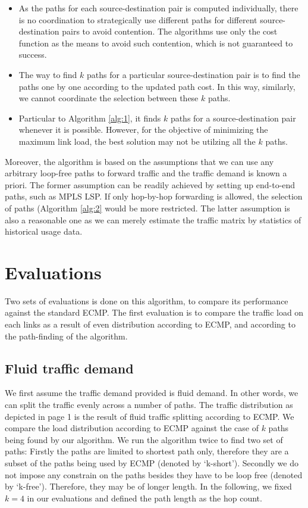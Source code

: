 \documentclass[conference]{IEEEtran}
\begin{document}
\begin{itemize}
\item As the paths for each source-destination pair is computed
	individually, there is no coordination to strategically use different
	paths for different source-destination pairs to avoid contention. The
	algorithms use only the cost function as the means to avoid such
	contention, which is not guaranteed to success.
\item The way to find $k$ paths for a particular source-destination pair is to
	find the paths one by one according to the updated path cost. In this
	way, similarly, we cannot coordinate the selection between these $k$
	paths.
\item Particular to Algorithm \ref{alg:1}, it finds $k$ paths for a
	source-destination pair whenever it is possible. However, for the
	objective of minimizing the maximum link load, the best solution may
	not be utilzing all the $k$ paths.
\end{itemize}

Moreover, the algorithm is based on the assumptions that we can use any
arbitrary loop-free paths to forward traffic and the traffic demand is known a
priori. The former assumption can be readily achieved by setting up end-to-end
paths, such as MPLS LSP. If only hop-by-hop forwarding is allowed, the
selection of paths (Algorithm \ref{alg:2} would be more restricted. The latter
assumption is also a reasonable one as we can merely estimate the traffic
matrix by statistics of historical usage data.

\section{Evaluations}\label{sec:eval}

Two sets of evaluations is done on this algorithm, to compare its performance
against the standard ECMP. The first evaluation is to compare the traffic load
on each links as a result of even distribution according to ECMP, and according
to the path-finding of the algorithm.

\subsection{Fluid traffic demand}

We first assume the traffic demand provided is fluid demand. In other words, we
can split the traffic evenly across a number of paths. The traffic distribution
as depicted in page 1 is the result of fluid traffic splitting according to
ECMP. We compare the load distribution according to ECMP against the case of
$k$ paths being found by our algorithm. We run the algorithm twice to find two
set of paths: Firstly the paths are limited to shortest path only, therefore
they are a subset of the paths being used by ECMP (denoted by `k-short').
Secondly we do not impose any constrain on the paths besides they have to be
loop free (denoted by `k-free'). Therefore, they may be of longer length. In
the following, we fixed $k=4$ in our evaluations and defined the path length as
the hop count.
\end{document}
